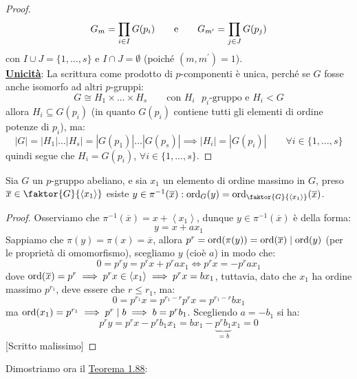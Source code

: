 \documentclass[11pt]{scrartcl}
\begin{document}
\begin{proof}
            \[ G_m = \prod_{i \in I}G(p_i) \qquad \text e \qquad G_{m^{\prime}} = \prod_{j \in J}G(p_j)
                \]
        con $I \cup J = \{1,\ldots,s\}$ e $I \cap J = \emptyset$ (poiché $(m,m^{\prime}) = 1$). \\
        \underline{\textbf{Unicità}}: La scrittura come prodotto di $p$-componenti è unica, perché se $G$ fosse anche isomorfo ad altri $p$-gruppi:
            \[ G \cong H_1 \times \ldots \times H_s \qquad \text{con $H_i$ $p_i$-gruppo e $H_i<G$}
                \]
        allora $H_i \subseteq G(p_i)$ (in quanto $G(p_i)$ contiene tutti gli elementi di ordine potenze di $p_i$), ma:
            \[ |G| = |H_1| \ldots |H_s| = |G(p_1)| \ldots |G(p_s)| \implies |H_i| = |G(p_i)| \qquad \forall i \in \{1,\ldots,s\}
                \]
        quindi segue che $H_i = G(p_i)$, $\forall i \in \{1,\ldots,s\}$. 
\end{proof}

\begin{lemma}
    \label{l:1.91}
    Sia $G$ un $p$-gruppo abeliano, e sia $x_1$ un elemento di ordine massimo in $G$, preso $\overline x \in \faktor{G}{\left<x_1\right>}$
     esiste $y \in \pi^{-1}(\overline x) : \ord_G(y) = \ord_{\faktor{G}{\left<x_1\right>}}(\overline x)$.
\end{lemma}

\begin{proof}
    Osserviamo che $\pi^{-1}(\overline x) = x + \left<x_1\right>$, dunque $y \in \pi^{-1}(\overline x)$ è della forma:
        \[ y = x + ax_1
            \]
    Sappiamo che $\pi(y) = \pi(x) = \overline x$, allora $p^r = \operatorname{ord}(\pi(y)) = \operatorname{ord}(\overline x) \mid \operatorname{ord}(y)$ (per le proprietà di omomorfismo), scegliamo $y$ (cioè $a$) in modo che:
        \[ 0 = p^ry = p^rx + p^rax_1 \iff p^rx = -p^rax_1 
            \]
    dove $\operatorname{ord}(\overline x) = p^r \implies p^rx \in \left<x_1\right> \implies p^rx = bx_1$, tuttavia, dato che $x_1$ ha ordine massimo $p^{r_1}$, deve essere che $r \leq r_1$, ma:
        \[ 0 = p^{r_1}x = p^{r_1 - r}p^rx = p^{r_1 - r}bx_1
            \]  
    ma $\operatorname{ord}(x_1) = p^{r_1} \implies p^r \mid b \implies b = p^rb_1$. Scegliendo $a = -b_1$ si ha:
        \[ p^ry = p^rx - p^rb_1x_1 = bx_1 - \underbrace{p^rb_1}_{= b}x_1 = 0
            \]
	 [Scritto malissimo]
\end{proof}

\pagebreak

Dimostriamo ora il \hyperref[t:t2]{Teorema 1.88}:
\end{document}
